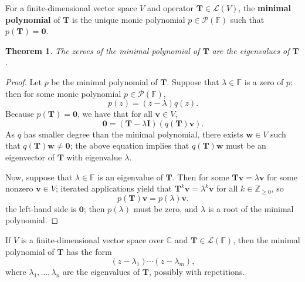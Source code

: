 \documentclass[11pt]{article}
\renewcommand{\vec}[1]{\mathbf{#1}}
\newcommand{\mat}[1]{\mathbf{#1}}
\newtheorem{theorem}{Theorem}
\begin{document}
For a finite-dimensional vector space $V$ and operator $\mat{T} \in \mathcal{L}(V)$, the \textbf{minimal polynomial} of $\mat{T}$ is the unique monic polynomial $p \in \mathcal{P}(\mathbb{F})$ such that $p(\mat{T}) = \mat{0}$.

\begin{theorem}
	The zeroes of the minimal polynomial of $\mat{T}$ are the eigenvalues of $\mat{T}$.
\end{theorem}
\begin{adjustwidth}{1cm}{}
	\begin{proof}
		Let $p$ be the minimal polynomial of $\mat{T}$. Suppose that $\lambda \in \mathbb{F}$ is a zero of $p$; then for some monic polynomial $p \in \mathcal{P}(\mathbb{F})$, 
		\[
			p(z) = (z - \lambda)q(z).
		\]
		Because $p(\mat{T}) = \mat{0}$, we have that for all $\vec{v} \in V$,
		\[
			\vec{0} = (\mat{T} - \lambda \mat{I})(q(\mat{T}) \vec{v}).
		\]
		As $q$ has smaller degree than the minimal polynomial, there exists $\vec{w} \in V$ such that $q(\mat{T}) \vec{w} \ne \vec{0}$; the above equation implies that $q(\mat{T}) \vec{w}$ must be an eigenvector of $\mat{T}$ with eigenvalue $\lambda$.

		Now, suppose that $\lambda \in \mathbb{F}$ is an eigenvalue of $\mat{T}$. Then for some $\mat{T} \vec{v} = \lambda \vec{v}$ for some nonzero $\vec{v} \in V$; iterated applications yield that $\mat{T}^{k} \vec{v} = \lambda^{k} \vec{v}$ for all $k \in \mathbb{Z}_{\ge 0}$, so
		\[
			p(\mat{T}) \vec{v} = p(\lambda) \vec{v}.
		\]
		the left-hand side is $\vec{0}$; then $p(\lambda)$ must be zero, and $\lambda$ is a root of the minimal polynomial.
	\end{proof}
\end{adjustwidth}

If $V$ is a finite-dimensional vector space over $\mathbb{C}$ and $\mat{T} \in \mathcal{L}(\mathbb{F})$, then the minimal polynomial of $\mat{T}$ has the form
\[
	(z - \lambda_{1}) \cdots (z - \lambda_{m}),
\]
where $\lambda_{1}, \ldots, \lambda_{n}$ are the eigenvalues of $\mat{T}$, possibly with repetitions.

\newpage
\end{document}
